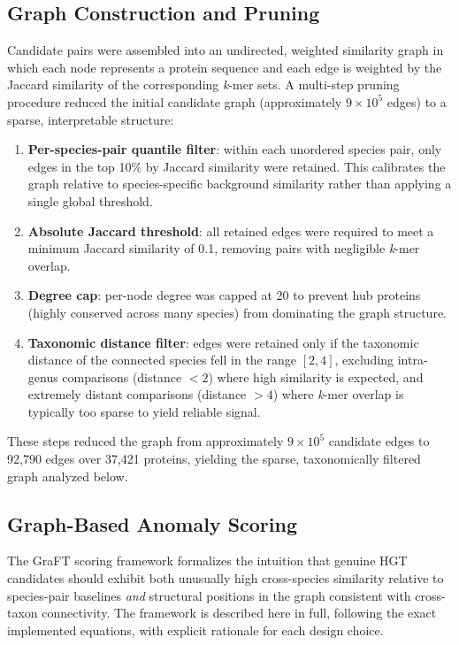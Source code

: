 \documentclass[11pt]{article}
\begin{document}
\subsection{Graph Construction and Pruning}

Candidate pairs were assembled into an undirected, weighted similarity graph in which each node represents a protein sequence and each edge is weighted by the Jaccard similarity of the corresponding \textit{k}-mer sets. A multi-step pruning procedure reduced the initial candidate graph (approximately $9 \times 10^5$ edges) to a sparse, interpretable structure:

\begin{enumerate}[noitemsep]
    \item \textbf{Per-species-pair quantile filter}: within each unordered species pair, only edges in the top 10\% by Jaccard similarity were retained. This calibrates the graph relative to species-specific background similarity rather than applying a single global threshold.
    \item \textbf{Absolute Jaccard threshold}: all retained edges were required to meet a minimum Jaccard similarity of 0.1, removing pairs with negligible \textit{k}-mer overlap.
    \item \textbf{Degree cap}: per-node degree was capped at 20 to prevent hub proteins (highly conserved across many species) from dominating the graph structure.
    \item \textbf{Taxonomic distance filter}: edges were retained only if the taxonomic distance of the connected species fell in the range $[2,4]$, excluding intra-genus comparisons (distance $< 2$) where high similarity is expected, and extremely distant comparisons (distance $> 4$) where \textit{k}-mer overlap is typically too sparse to yield reliable signal.
\end{enumerate}

These steps reduced the graph from approximately $9 \times 10^5$ candidate edges to 92,790 edges over 37,421 proteins, yielding the sparse, taxonomically filtered graph analyzed below.

\subsection{Graph-Based Anomaly Scoring}
\label{sec:scoring}

The GraFT scoring framework formalizes the intuition that genuine HGT candidates should exhibit both unusually high cross-species similarity relative to species-pair baselines \textit{and} structural positions in the graph consistent with cross-taxon connectivity. The framework is described here in full, following the exact implemented equations, with explicit rationale for each design choice.
\end{document}

